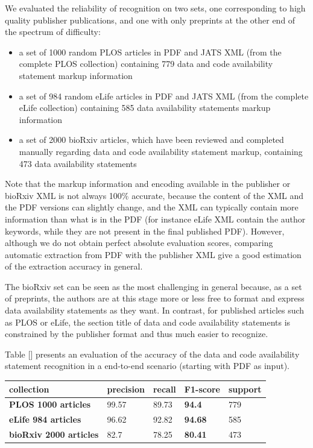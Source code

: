 \documentclass[
]{article}
\begin{document}
We evaluated the reliability of recognition on two sets, one
corresponding to high quality publisher publications, and one with only
preprints at the other end of the spectrum of difficulty:

\begin{itemize}
\item
  a set of 1000 random PLOS articles in PDF and JATS XML (from the
  complete PLOS collection) containing 779 data and code availability
  statement markup information
\item
  a set of 984 random eLife articles in PDF and JATS XML (from the
  complete eLife collection) containing 585 data availability statements
  markup information
\item
  a set of 2000 bioRxiv articles, which have been reviewed and completed
  manually regarding data and code availability statement markup,
  containing 473 data availability statements
\end{itemize}

Note that the markup information and encoding available in the publisher
or bioRxiv XML is not always 100\% accurate, because the content of the
XML and the PDF versions can slightly change, and the XML can typically
contain more information than what is in the PDF (for instance eLife XML
contain the author keywords, while they are not present in the final
published PDF). However, although we do not obtain perfect absolute
evaluation scores, comparing automatic extraction from PDF with the
publisher XML give a good estimation of the extraction accuracy in
general.

The bioRxiv set can be seen as the most challenging in general because,
as a set of preprints, the authors are at this stage more or less free
to format and express data availability statements as they want. In
contrast, for published articles such as PLOS or eLife, the section
title of data and code availability statements is constrained by the
publisher format and thus much easier to recognize.

Table {[}{]} presents an evaluation of the accuracy of the data and code
availability statement recognition in a end-to-end scenario (starting
with PDF as input).

\begin{longtable}[]{@{}lllll@{}}
\toprule
collection & precision & recall & \textbf{F1-score} &
support\tabularnewline
\midrule
\endhead
\textbf{PLOS 1000 articles} & 99.57 & 89.73 & \textbf{94.4} &
779\tabularnewline
\textbf{eLife 984 articles} & 96.62 & 92.82 & \textbf{94.68} &
585\tabularnewline
\textbf{bioRxiv 2000 articles} & 82.7 & 78.25 & \textbf{80.41} &
473\tabularnewline
\bottomrule
\end{longtable}
\end{document}
